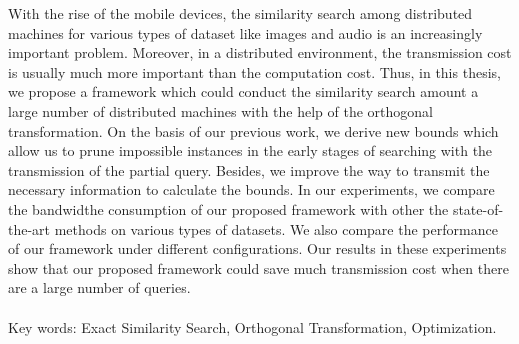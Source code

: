 \begin{abstractEN}

With the rise of the mobile devices, the similarity search among distributed machines for various types of dataset like images and audio is an increasingly important problem.  Moreover, in a distributed environment, the transmission cost is usually much more important than the computation cost.  Thus, in this thesis, we propose a framework which could conduct the similarity search amount a large number of distributed machines with the help of the orthogonal transformation.  On the basis of our previous work, we derive new bounds which allow us to prune impossible instances in the early stages of searching with the transmission of the partial query.  Besides, we improve the way to transmit the necessary information to calculate the bounds.  In our experiments, we compare the bandwidthe consumption of our proposed framework with other the state-of-the-art methods on various types of datasets.  We also compare the performance of our framework under different configurations.  Our results in these experiments show that our proposed framework could save much transmission cost when there are a large number of queries.
\\ \\
Key words: Exact Similarity Search, Orthogonal Transformation, Optimization.

\end{abstractEN}
